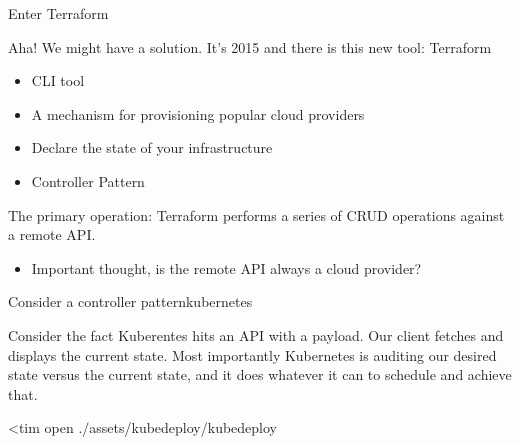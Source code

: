\documentclass{beamer}
\begin{document}
\begin{frame}{Enter Terraform}

Aha! We might have a solution. It's 2015 and there is this new tool: Terraform
\vspace{0.3cm}

\begin{itemize}
    \item CLI tool
    \item A mechanism for provisioning popular cloud providers
    \item Declare the state of your infrastructure
    \item Controller Pattern
\end{itemize}

\vspace{0.3cm}
The primary operation: Terraform performs a series of CRUD operations against a remote API.

\begin{itemize}
    \item Important thought, is the remote API always a cloud provider?
\end{itemize} 

\end{frame}


\begin{frame}{Consider a controller pattern}{kubernetes}

Consider the fact Kuberentes hits an API with a payload. Our client fetches and displays the current state. Most importantly Kubernetes is auditing our desired state versus the current state, and it does whatever it can to schedule and achieve that.

\vspace{0.3cm}
\centering
<tim open ./assets/kubedeploy/kubedeploy

\end{frame}

\end{document}

